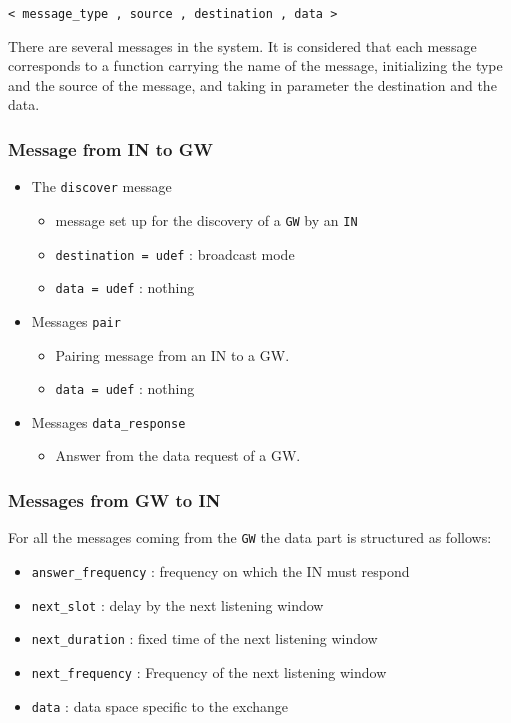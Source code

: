 \documentclass[conference]{IEEEtran}
\begin{document}
\begin{center}
\texttt{< message\_type , source , destination , data >}
\end{center}

There are several messages in the system. It is considered that each message corresponds to a function carrying the name of the message, initializing the type and the source of the message, and taking in parameter the destination and the data.

\subsubsection{Message from IN to GW}
\begin{itemize}
    \item The \texttt{discover} message
    \begin{itemize}
      \item message set up for the discovery of a \texttt{GW} by an \texttt{IN}
      \item \texttt{destination = udef} :  broadcast mode
      \item \texttt{data = udef} : nothing
    \end{itemize}
    \item  Messages \texttt{pair}
    \begin{itemize}
      \item Pairing message from an IN to a GW.
      \item \texttt{data = udef} : nothing
    \end{itemize}
    \item Messages \texttt{data\_response}
    \begin{itemize}
      \item Answer from the data request of a GW.
    \end{itemize}
\end{itemize}

\subsubsection{Messages from GW to IN}
For all the messages coming from the \texttt{GW} the data part is structured as follows:

\begin{itemize}
  \item \texttt{answer\_frequency} : frequency on which the IN must respond
  \item \texttt{next\_slot} : delay by the next listening window
  \item \texttt{next\_duration} : fixed time of the next listening window
  \item \texttt{next\_frequency} : Frequency of the next listening window
  \item \texttt{data} : data space specific to the exchange
\end{itemize}
\end{document}
